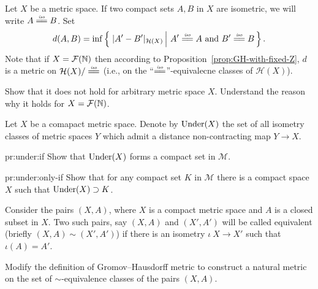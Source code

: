 \begin{pr}\label{pr:F-X}
Let $X$ be a metric space.
If two compact sets $A, B$ in $X$ are isometric,
we will write $A\iso B$. 
Set
$$d(A,B)=\inf \set{|A'-B'|_{\mathcal{H}(X)}}{A'\iso A \ \text{and}\ B'\iso B}.$$
Note that if $X=\mathcal{F}(\mathbb{N})$ then according to Proposition~\ref{prop:GH-with-fixed-Z}, 
$d$ is a metric on $\mathcal{H}(X)/\iso$ (i.e., on the ``$\iso$''-equivalecne classes of $\mathcal{H}(X)$).

Show that it does not hold for arbitrary metric space $X$.
Understand the reason why it holds for $X=\mathcal{F}(\mathbb{N})$.
\end{pr}

\begin{pr}\label{pr:under}
Let $X$ be a comapact metric space.
Denote by $\operatorname{Under}(X)$ the set of all isometry classes of metric spaces $Y$ 
which admit a distance non-contracting map $Y\to X$.

\begin{subthm}{pr:under:if}
Show that $\operatorname{Under}(X)$ forms a compact set in $\mathcal{M}$.
\end{subthm}

\begin{subthm}{pr:under:only-if}
Show that for any compact set $K$ in $\mathcal{M}$ there is a compact space $X$
such that  $\operatorname{Under}(X)\supset K$.
\end{subthm}

\end{pr}

\begin{pr}\label{pr:GH-variation}
Consider the pairs $(X,A)$, where $X$ is a compact metric space and $A$ is a closed subset in $X$.
Two such pairs, say $(X,A)$ and $(X',A')$ will be called equivalent (briefly $(X,A)\sim(X',A')$)
if there is an isometry $\iota\:X\to X'$ such that $\iota(A)=A'$.

Modify the definition of Gromov--Hausdorff metric to construct a natural metric on the set of $\sim$-equivalence classes of the pairs $(X,A)$.
\end{pr}



